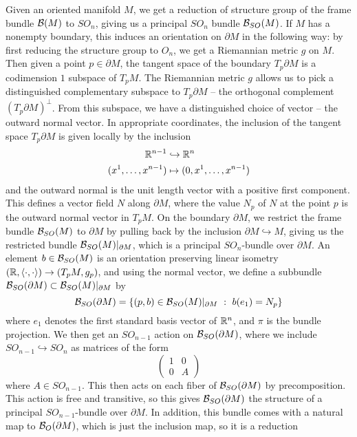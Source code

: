 %
Given an oriented manifold $M$, we get a reduction of structure group
of the frame bundle $\mathcal{B}(M)$ to $SO_n$, giving us a principal $SO_n$ bundle
$\mathcal{B}_{SO}(M)$. If $M$ has a nonempty boundary, this induces an orientation on
$\partial M$ in the following way: by first reducing the structure group to $O_n$,
we get a Riemannian metric $g$ on $M$. Then given a point $p \in \partial M$,
the tangent space of the boundary $T_p\partial M$ is a codimension $1$ subspace
of $T_pM$. The Riemannian metric $g$ allows us to pick a distinguished complementary
subspace to $T_p\partial M$ -- the orthogonal complement $(T_p \partial M)^\perp$.
From this subspace, we have a distinguished choice of vector -- the outward
normal vector. In appropriate coordinates, the inclusion of the tangent space
$T_p\partial M$ is given locally by the inclusion
%
\begin{align*}
\mathbb{R}^{n-1} &\hookrightarrow \mathbb{R}^n \\
(x^1, \ldots, x^{n-1}) &\mapsto (0, x^1, \ldots, x^{n-1})
\end{align*}
%
and the outward normal is the unit length vector with a positive first component.
This defines a vector field $N$ along $\partial M$, where the value $N_p$
of $N$ at the point $p$ is the outward normal vector in $T_pM$.
On the boundary $\partial M$, we restrict the frame bundle $\mathcal{B}_{SO}(M)$
to $\partial M$ by pulling back by the inclusion $\partial M \hookrightarrow M$,
giving us the restricted bundle $\mathcal{B}_{SO}(M)\vert_{\partial M}$, which is a principal
$SO_n$-bundle over $\partial M$. An element $b \in \mathcal{B}_{SO}(M)$ is an orientation
preserving linear isometry $(\mathbb{R}, \langle \cdot,\cdot\rangle) \to (T_pM, g_p)$, and
using the normal vector, we define a subbundle
$\mathcal{B}_{SO}(\partial M) \subset \mathcal{B}_{SO}(M)\vert_{\partial M}$ by
\[
\mathcal{B}_{SO}(\partial M) = \left\lbrace (p, b) \in \mathcal{B}_{SO}(M)\vert_{\partial M} ~:~
b(e_1) = N_p \right\rbrace
\]
where $e_1$ denotes the first standard basis vector of $\mathbb{R}^n$, and $\pi$ is
the bundle projection. We then get an $SO_{n-1}$ action on $\mathcal{B}_{SO}(\partial M)$,
where we include $SO_{n-1} \hookrightarrow SO_n$ as matrices of the form
\[
\begin{pmatrix}
1 & 0 \\
0 & A
\end{pmatrix}
\]
where $A \in SO_{n-1}$. This then acts on each fiber of $\mathcal{B}_{SO}(\partial M)$
by precomposition. This action is free and transitive, so this gives
$\mathcal{B}_{SO}(\partial M)$ the structure of a principal $SO_{n-1}$-bundle over
$\partial M$. In addition, this bundle comes with a natural map to
$\mathcal{B}_O(\partial M)$, which is just the inclusion map, so it is a reduction
